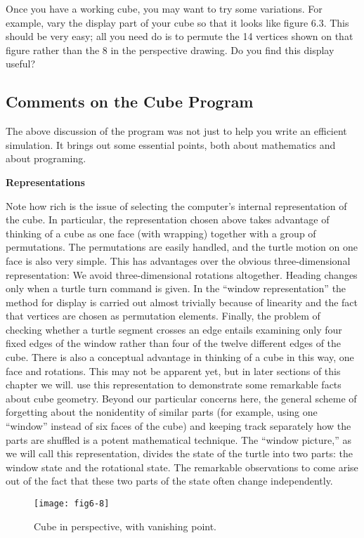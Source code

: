 \documentclass{book}
\begin{document}
Once you have a working cube, you may want to try some variations.
For example, vary the display part of your cube so that it looks like
figure 6.3. This should be very easy; all you need do is to permute the
14 vertices shown on that figure rather than the 8 in the perspective
drawing. Do you find this display useful?

\subsection{Comments on the Cube Program}

The above discussion of the program was not just to help you write
an efficient simulation. It brings out some essential points, both about
mathematics and about programing.

\textbf{Representations}

Note how rich is the issue of selecting the computer's internal representation of the cube. In particular, the representation chosen above
takes advantage of thinking of a cube as one face (with wrapping)
together with a group of permutations. The permutations are easily
handled, and the turtle motion on one face is also very simple. This has
advantages over the obvious three-dimensional representation: We avoid
three-dimensional rotations altogether. Heading changes only when a
turtle turn command is given. In the ``window representation'' the
method for display is carried out almost trivially because of linearity
and the fact that vertices are chosen as permutation elements. Finally,
the problem of checking whether a turtle segment crosses an edge entails
examining only four fixed edges of the window rather than four of the
twelve different edges of the cube. There is also a conceptual advantage
in thinking of a cube in this way, one face and rotations. This may
not be apparent yet, but in later sections of this chapter we will. use
this representation to demonstrate some remarkable facts about cube
geometry. Beyond our particular concerns here, the general scheme of
forgetting about the nonidentity of similar parts (for example, using one
``window'' instead of six faces of the cube) and keeping track separately
how the parts are shuffled is a potent mathematical technique. The
``window picture,'' as we will call this representation, divides the state
of the turtle into two parts: the window state and the rotational state.
The remarkable observations to come arise out of the fact that these two
parts of the state often change independently.

\begin{figure}
\begin{center}
\texttt{[image: fig6-8]}
\caption{Cube in perspective, with vanishing point.}
\end{center}
\end{figure}
\end{document}

